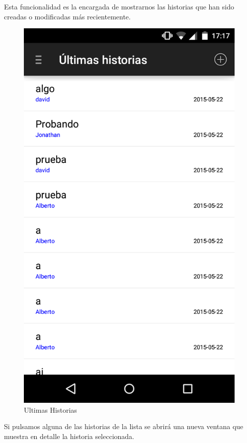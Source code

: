 \documentclass[11pt,a4paper, titlepage]{article}
\begin{document}
	Esta funcionalidad es la encargada de mostrarnos las historias que han sido creadas o modificadas más recientemente.
	
	\begin{figure}[hbtp]
		\centering
		\includegraphics[scale = 0.25 ]{img/4}
		\caption{Ultimas Historias}
		\label{p11}
	\end{figure}
	
	Si pulsamos alguna de las historias de la lista se abrirá una nueva ventana que muestra en detalle la historia seleccionada.
	
\end{document}
